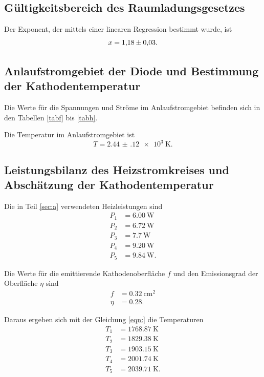 \subsection{Gültigkeitsbereich des Raumladungsgesetzes}
Der Exponent, der mittels einer linearen Regression
bestimmt wurde, ist
\begin{equation*}
    x = \num{1.18 \pm 0.03}.
\end{equation*}

\subsection{Anlaufstromgebiet der Diode und Bestimmung der Kathodentemperatur}
Die Werte für die Spannungen und Ströme im Anlaufstromgebiet
befinden sich in den Tabellen \ref{tabf} bis \ref{tabh}.





\noindent Die Temperatur im Anlaufstromgebiet ist %
\begin{equation*}
    T = \SI{2.44(12)e3}{\kelvin}.
\end{equation*}
%

\subsection{Leistungsbilanz des Heizstromkreises und Abschätzung der Kathodentemperatur}
Die in Teil \ref{sec:a} verwendeten Heizleistungen sind
\begin{align*}
    P_\text{1} &= \SI{6.00}{\watt} \\
    P_\text{2} &= \SI{6.72}{\watt} \\
    P_\text{3} &= \SI{7.7}{\watt} \\
    P_\text{4} &= \SI{9.20}{\watt} \\
    P_\text{5} &= \SI{9.84}{\watt}.
\end{align*}

\noindent Die Werte für die emittierende Kathodenoberfläche $f$ und den
Emissionsgrad der Oberfläche $\eta$ sind
\begin{align*}
    f &= \SI{0.32}{\centi\meter\squared} \\
    \eta &= \num{0.28}.
\end{align*}

\noindent Daraus ergeben sich mit der Gleichung \eqref{eqn:} 
die Temperaturen
\begin{align*}
    T_\text{1} &= \SI{1768.87}{\kelvin} \\
    T_\text{2} &= \SI{1829.38}{\kelvin} \\
    T_\text{3} &= \SI{1903.15}{\kelvin} \\
    T_\text{4} &= \SI{2001.74}{\kelvin} \\
    T_\text{5} &= \SI{2039.71}{\kelvin}.
\end{align*}

